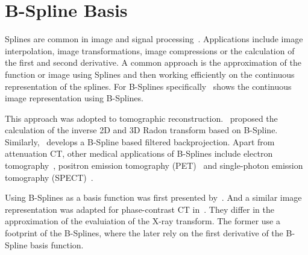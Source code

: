 \section{B-Spline Basis}\label{sec:bspline_basis}

Splines are common in image and signal processing~\cite{unser_splines_1999}. Applications include
image interpolation, image transformations, image compressions or the calculation of the first and
second derivative. A common approach is the approximation of the function or image using Splines and
then working efficiently on the continuous representation of the splines. For B-Splines
specifically~\cite{unser_fast_1991} shows the continuous image representation using B-Splines.

This approach was adopted to tomographic reconstruction.~\cite{la_riviere_spline-based_1998}
proposed the calculation of the inverse 2D and 3D Radon transform based on B-Spline.
Similarly,~\cite{horbelt_discretization_2002} develops a B-Spline based filtered backprojection.
Apart from attenuation CT, other medical applications of B-Splines include electron
tomography~\cite{tran_robust_2013, tran_inverse_2014}, positron emission tomography
(PET)~\cite{nichols_spatiotemporal_2002, li_fast_2007, verhaeghe_investigation_2007} and
single-photon emission tomography (SPECT)~\cite{guedon_b-spline_1991, reutter_fully_2007}.

Using B-Splines as a basis function was first presented by~\cite{momey_new_2011,
momey_b-spline_2012, momey_spline_2015}. And a similar image representation was adapted for
phase-contrast CT in~\cite{nilchian_fast_2013, nilchian_differential_2012, nilchian_spline_2015}.
They differ in the approximation of the evaluiation of the X-ray transform. The former use a
footprint of the B-Splines, where the later rely on the first derivative of the B-Spline basis
function.

